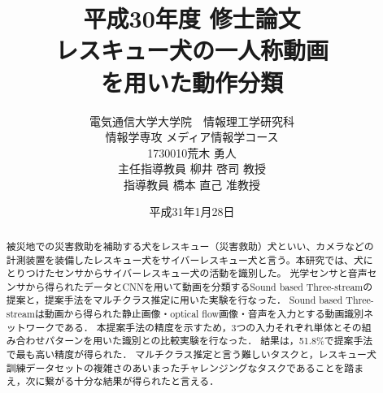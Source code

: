 \documentclass[a4j,12pt]{jreport}
\title{
	平成30年度 修士論文\vspace{1cm}\\
	\huge  レスキュー犬の一人称動画\\を用いた動作分類\vspace{6cm}
}
\author{
	電気通信大学大学院　情報理工学研究科\\
	情報学専攻 メディア情報学コース\\
	1730010\hspace{1cm}荒木 勇人\\
	主任指導教員 柳井 啓司 教授\\
        指導教員 橋本 直己 准教授
}
\date{
平成31年1月28日
}
\begin{document}
\maketitle
\thispagestyle{empty}
\pagebreak

\begin{abstract}

被災地での災害救助を補助する犬をレスキュー（災害救助）犬といい、カメラなどの計測装置を装備したレスキュー犬をサイバーレスキュー犬と言う。本研究では、犬にとりつけたセンサからサイバーレスキュー犬の活動を識別した。
光学センサと音声センサから得られたデータとCNNを用いて動画を分類するSound based Three-streamの提案と，提案手法をマルチクラス推定に用いた実験を行なった．
Sound based Three-streamは動画から得られた静止画像・optical flow画像・音声を入力とする動画識別ネットワークである．
本提案手法の精度を示すため，3つの入力それぞれ単体とその組み合わせパターンを用いた識別との比較実験を行なった．
結果は，51.8\%で提案手法で最も高い精度が得られた．
マルチクラス推定と言う難しいタスクと，レスキュー犬訓練データセットの複雑さのあいまったチャレンジングなタスクであることを踏まえ，次に繋がる十分な結果が得られたと言える．


\par


\end{abstract}

\pagestyle{jgraduate}


\tableofcontents

\pagebreak

\newpage











%

\end{document}
